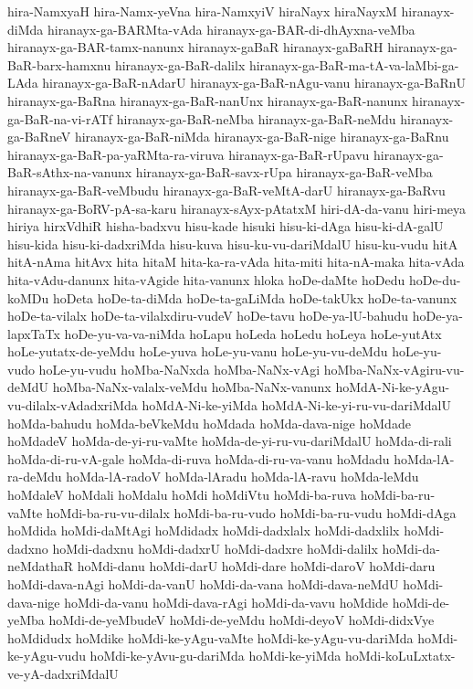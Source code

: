 {hira-NamxyaH
hira-Namx-yeVna
hira-NamxyiV
hiraNayx
hiraNayxM
hiranayx-diMda
hiranayx-ga-BARMta-vAda
hiranayx-ga-BAR-di-dhAyxna-veMba
hiranayx-ga-BAR-tamx-nanunx
hiranayx-gaBaR
hiranayx-gaBaRH
hiranayx-ga-BaR-barx-hamxnu
hiranayx-ga-BaR-dalilx
hiranayx-ga-BaR-ma-tA-va-laMbi-ga-LAda
hiranayx-ga-BaR-nAdarU
hiranayx-ga-BaR-nAgu-vanu
hiranayx-ga-BaRnU
hiranayx-ga-BaRna
hiranayx-ga-BaR-nanUnx
hiranayx-ga-BaR-nanunx
hiranayx-ga-BaR-na-vi-rATf
hiranayx-ga-BaR-neMba
hiranayx-ga-BaR-neMdu
hiranayx-ga-BaRneV
hiranayx-ga-BaR-niMda
hiranayx-ga-BaR-nige
hiranayx-ga-BaRnu
hiranayx-ga-BaR-pa-yaRMta-ra-viruva
hiranayx-ga-BaR-rUpavu
hiranayx-ga-BaR-sAthx-na-vanunx
hiranayx-ga-BaR-savx-rUpa
hiranayx-ga-BaR-veMba
hiranayx-ga-BaR-veMbudu
hiranayx-ga-BaR-veMtA-darU
hiranayx-ga-BaRvu
hiranayx-ga-BoRV-pA-sa-karu
hiranayx-sAyx-pAtatxM
hiri-dA-da-vanu
hiri-meya
hiriya
hirxVdhiR
hisha-badxvu
hisu-kade
hisuki
hisu-ki-dAga
hisu-ki-dA-galU
hisu-kida
hisu-ki-dadxriMda
hisu-kuva
hisu-ku-vu-dariMdalU
hisu-ku-vudu
hitA
hitA-nAma
hitAvx
hita
hitaM
hita-ka-ra-vAda
hita-miti
hita-nA-maka
hita-vAda
hita-vAdu-danunx
hita-vAgide
hita-vanunx
hloka
hoDe-daMte
hoDedu
hoDe-du-koMDu
hoDeta
hoDe-ta-diMda
hoDe-ta-gaLiMda
hoDe-takUkx
hoDe-ta-vanunx
hoDe-ta-vilalx
hoDe-ta-vilalxdiru-vudeV
hoDe-tavu
hoDe-ya-lU-bahudu
hoDe-ya-lapxTaTx
hoDe-yu-va-va-niMda
hoLapu
hoLeda
hoLedu
hoLeya
hoLe-yutAtx
hoLe-yutatx-de-yeMdu
hoLe-yuva
hoLe-yu-vanu
hoLe-yu-vu-deMdu
hoLe-yu-vudo
hoLe-yu-vudu
hoMba-NaNxda
hoMba-NaNx-vAgi
hoMba-NaNx-vAgiru-vu-deMdU
hoMba-NaNx-valalx-veMdu
hoMba-NaNx-vanunx
hoMdA-Ni-ke-yAgu-vu-dilalx-vAdadxriMda
hoMdA-Ni-ke-yiMda
hoMdA-Ni-ke-yi-ru-vu-dariMdalU
hoMda-bahudu
hoMda-beVkeMdu
hoMdada
hoMda-dava-nige
hoMdade
hoMdadeV
hoMda-de-yi-ru-vaMte
hoMda-de-yi-ru-vu-dariMdalU
hoMda-di-rali
hoMda-di-ru-vA-gale
hoMda-di-ruva
hoMda-di-ru-va-vanu
hoMdadu
hoMda-lA-ra-deMdu
hoMda-lA-radoV
hoMda-lAradu
hoMda-lA-ravu
hoMda-leMdu
hoMdaleV
hoMdali
hoMdalu
hoMdi
hoMdiVtu
hoMdi-ba-ruva
hoMdi-ba-ru-vaMte
hoMdi-ba-ru-vu-dilalx
hoMdi-ba-ru-vudo
hoMdi-ba-ru-vudu
hoMdi-dAga
hoMdida
hoMdi-daMtAgi
hoMdidadx
hoMdi-dadxlalx
hoMdi-dadxlilx
hoMdi-dadxno
hoMdi-dadxnu
hoMdi-dadxrU
hoMdi-dadxre
hoMdi-dalilx
hoMdi-da-neMdathaR
hoMdi-danu
hoMdi-darU
hoMdi-dare
hoMdi-daroV
hoMdi-daru
hoMdi-dava-nAgi
hoMdi-da-vanU
hoMdi-da-vana
hoMdi-dava-neMdU
hoMdi-dava-nige
hoMdi-da-vanu
hoMdi-dava-rAgi
hoMdi-da-vavu
hoMdide
hoMdi-de-yeMba
hoMdi-de-yeMbudeV
hoMdi-de-yeMdu
hoMdi-deyoV
hoMdi-didxVye
hoMdidudx
hoMdike
hoMdi-ke-yAgu-vaMte
hoMdi-ke-yAgu-vu-dariMda
hoMdi-ke-yAgu-vudu
hoMdi-ke-yAvu-gu-dariMda
hoMdi-ke-yiMda
hoMdi-koLuLxtatx-ve-yA-dadxriMdalU
}
